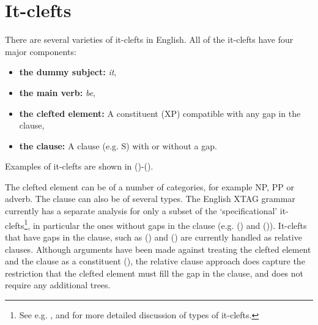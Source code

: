 \chapter{It-clefts}
\label{it-clefts}

There are several varieties of it-clefts in English.  All of the
it-clefts have four major components:

\begin{itemize}
\item {\bf the dummy subject:}  {\it it},
\item {\bf the main verb:}  {\it be},
\item {\bf the clefted element:}  A constituent (XP) compatible with
any gap in the clause,
\item {\bf the clause:}  A clause (e.g. S) with or without a gap.
\end{itemize}

\noindent
Examples of it-clefts are shown in ()-().


The clefted element can be of a number of categories, for example NP, PP or
adverb. The clause can also be of several types. The English XTAG grammar
currently has a separate analysis for only a subset of the `specificational'
it-clefts\footnote{See e.g. \cite{Ball91},
\cite{Delin89} and \cite{Delahunty84} for more detailed discussion of
types of it-clefts.}, in particular the ones without gaps in the clause
(e.g. () and ()).  It-clefts that have gaps in the clause, such
as () and () are currently handled as relative clauses. Although
arguments have been made against treating the clefted element and the clause as
a constituent (\cite{Delahunty84}), the relative clause approach does capture
the restriction that the clefted element must fill the gap in the clause, and
does not require any additional trees.

